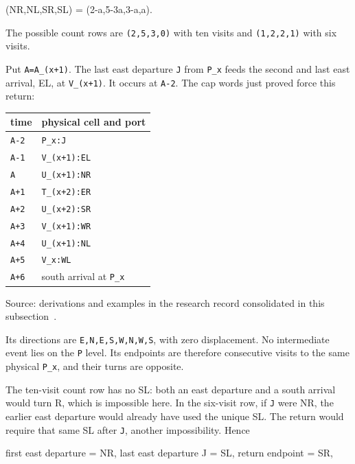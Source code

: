 \documentclass[11pt,letterpaper]{article}
\theoremstyle{plain}
\theoremstyle{definition}
\begin{document}
\begin{NoHyper}
\begin{codeblock}
(NR,NL,SR,SL) = (2-a,5-3a,3-a,a).
\end{codeblock}

The possible count rows are \texttt{(2,5,3,0)} with ten visits and \texttt{(1,2,2,1)} with six visits.

Put \texttt{A=A\_(x+1)}. The last east departure \texttt{J} from \texttt{P\_x} feeds the second and last east arrival, EL, at \texttt{V\_(x+1)}. It occurs at \texttt{A-2}. The cap words just proved force this return:

{\def\LTcaptype{table} %
\begin{longtable}[]{@{}ll@{}}
\toprule\noalign{}
time & physical cell and port \\
\midrule\noalign{}
\endhead
\bottomrule\noalign{}
\endlastfoot
\texttt{A-2} & \texttt{P\_x:J} \\
\texttt{A-1} & \texttt{V\_(x+1):EL} \\
\texttt{A} & \texttt{U\_(x+1):NR} \\
\texttt{A+1} & \texttt{T\_(x+2):ER} \\
\texttt{A+2} & \texttt{U\_(x+2):SR} \\
\texttt{A+3} & \texttt{V\_(x+1):WR} \\
\texttt{A+4} & \texttt{U\_(x+1):NL} \\
\texttt{A+5} & \texttt{V\_x:WL} \\
\texttt{A+6} & south arrival at \texttt{P\_x} \\
\end{longtable}
{\footnotesize Source: derivations and examples in the research record consolidated in this subsection~\cite{Repo}.\par}
}

Its directions are \texttt{E,N,E,S,W,N,W,S}, with zero displacement. No intermediate event lies on the \texttt{P} level. Its endpoints are therefore consecutive visits to the same physical \texttt{P\_x}, and their turns are opposite.

The ten-visit count row has no SL: both an east departure and a south arrival would turn R, which is impossible here. In the six-visit row, if \texttt{J} were NR, the earlier east departure would already have used the unique SL. The return would require that same SL after \texttt{J}, another impossibility. Hence

\begin{codeblock}
first east departure = NR,
last east departure J = SL,
return endpoint = SR,
\end{codeblock}


\end{NoHyper}
\end{document}

